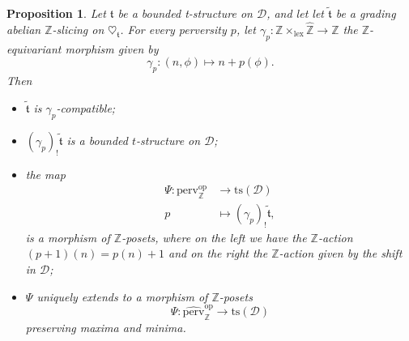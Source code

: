 \documentclass{article}
\newtheorem{prop}[thm]{Proposition}
\theoremstyle{definition}
\newcommand{\Z}{\mathbb{Z}}
\newcommand{\ts}{\mathrm{ts}}
\newcommand{\tee}{\mathfrak{t}}
\begin{document}
\begin{prop}\label{grad}
Let $\mathfrak{t}$ be a bounded t-structure on $\mathscr{D}$, and let let $\tilde{\tee}$ be a grading abelian $\mathbb{Z}$-slicing on $\heartsuit_{\mathfrak{t}}$. For every perversity $p$, 
let $\gamma_p\colon \Z\times_{\mathrm{lex}}\hat{\Z}\to \Z$ the $\Z$-equivariant morphism given by 
\[
\gamma_p\colon (n,\phi)\mapsto n+p(\phi).
\]
Then
\begin{itemize}
\item $\tilde{\tee}$ is $\gamma_p$-compatible;
\item $ (\gamma_p)_!\tilde{\tee}$ is a bounded $t$-structure on $\mathscr{D}$;
\item the map
\begin{align*}
\Psi\colon \mathrm{perv}_\Z^{\mathrm{op}}&\to \ts(\mathscr{D})\\
p&\mapsto (\gamma_p)_!\tilde{\tee},
\end{align*}
is a morphism of $\Z$-posets, where on the left we have the $\Z$-action $(p+1)(n)=p(n)+1$ and on the right the $\Z$-action given by the shift in $\mathscr{D}$;
\item 
$\Psi$ uniquely extends to a morphism of $\Z$-posets
\[
\Psi\colon \widehat{\mathrm{perv}}_\Z^{\mathrm{op}}\to \ts(\mathscr{D})
\]
preserving maxima and minima.
\end{itemize}
\end{prop}
\end{document}
